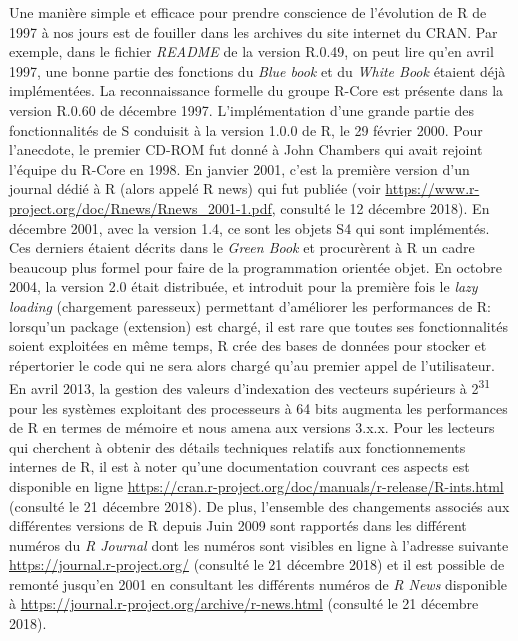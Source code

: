 \documentclass[]{article}
\begin{document}
Une manière simple et efficace pour prendre conscience de l'évolution de R de 1997 à nos jours est de fouiller dans les archives du site internet du CRAN. Par exemple, dans le fichier \emph{README} de la version R.0.49, on peut lire qu'en avril 1997, une bonne partie des fonctions du \emph{Blue book} \citep{becker_new_1988} et du \emph{White Book} \citep{chambers_statistical_1993} étaient déjà implémentées. La reconnaissance formelle du groupe R-Core est présente dans la version R.0.60 de décembre 1997. L'implémentation d'une grande partie des fonctionnalités de S conduisit à la version 1.0.0 de R, le 29 février 2000. Pour l'anecdote, le premier CD-ROM fut donné à John Chambers qui avait rejoint l'équipe du R-Core en 1998. En janvier 2001, c'est la première version d'un journal dédié à R (alors appelé R news) qui fut publiée (voir \url{https://www.r-project.org/doc/Rnews/Rnews_2001-1.pdf}, consulté le 12 décembre 2018). En décembre 2001, avec la version 1.4, ce sont les objets S4 qui sont implémentés. Ces derniers étaient décrits dans le \emph{Green Book} \citep{chambers_programming_1998} et procurèrent à R un cadre beaucoup plus formel pour faire de la programmation orientée objet. En octobre 2004, la version 2.0 était distribuée, et introduit pour la première fois le \emph{lazy loading} (chargement paresseux) permettant d'améliorer les performances de R: lorsqu'un package (extension) est chargé, il est rare que toutes ses fonctionnalités soient exploitées en même temps, R crée des bases de données pour stocker et répertorier le code qui ne sera alors chargé qu'au premier appel de l'utilisateur. En avril 2013, la gestion des valeurs d'indexation des vecteurs supérieurs à 2\textsuperscript{31} pour les systèmes exploitant des processeurs à 64 bits augmenta les performances de R en termes de mémoire et nous amena aux versions 3.x.x. Pour les lecteurs qui cherchent à obtenir des détails techniques relatifs aux fonctionnements internes de R, il est à noter qu'une documentation couvrant ces aspects est disponible en ligne \url{https://cran.r-project.org/doc/manuals/r-release/R-ints.html} (consulté le 21 décembre 2018). De plus, l'ensemble des changements associés aux différentes versions de R depuis Juin 2009 sont rapportés dans les différent numéros du \emph{R Journal} dont les numéros sont visibles en ligne à l'adresse suivante \url{https://journal.r-project.org/} (consulté le 21 décembre 2018) et il est possible de remonté jusqu'en 2001 en consultant les différents numéros de \emph{R News} disponible à \url{https://journal.r-project.org/archive/r-news.html}
(consulté le 21 décembre 2018).
\end{document}

